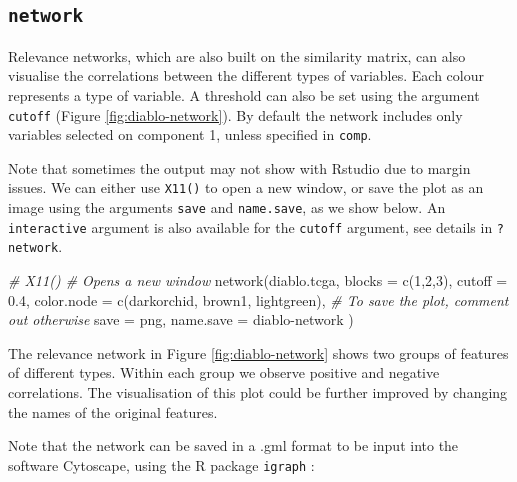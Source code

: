 \documentclass[
]{book}
\newenvironment{Shaded}{\begin{snugshade}}{\end{snugshade}}
\newcommand{\AttributeTok}[1]{\textcolor[rgb]{0.77,0.63,0.00}{#1}}
\newcommand{\CommentTok}[1]{\textcolor[rgb]{0.56,0.35,0.01}{\textit{#1}}}
\newcommand{\DecValTok}[1]{\textcolor[rgb]{0.00,0.00,0.81}{#1}}
\newcommand{\FloatTok}[1]{\textcolor[rgb]{0.00,0.00,0.81}{#1}}
\newcommand{\FunctionTok}[1]{\textcolor[rgb]{0.00,0.00,0.00}{#1}}
\newcommand{\NormalTok}[1]{#1}
\newcommand{\StringTok}[1]{\textcolor[rgb]{0.31,0.60,0.02}{#1}}
\begin{document}
\hypertarget{network}{%
\subsection{\texorpdfstring{\texttt{network}}{network}}\label{network}}

Relevance networks, which are also built on the similarity matrix, can also visualise the correlations between the different types of variables. Each colour represents a type of variable. A threshold can also be set using the argument \texttt{cutoff} (Figure \ref{fig:diablo-network}). By default the network includes only variables selected on component 1, unless specified in \texttt{comp}.

Note that sometimes the output may not show with Rstudio due to margin issues. We can either use \texttt{X11()} to open a new window, or save the plot as an image using the arguments \texttt{save} and \texttt{name.save}, as we show below. An \texttt{interactive} argument is also available for the \texttt{cutoff} argument, see details in \texttt{?network}.

\begin{Shaded}
\begin{Highlighting}[]
\CommentTok{\# X11()   \# Opens a new window}
\FunctionTok{network}\NormalTok{(diablo.tcga, }\AttributeTok{blocks =} \FunctionTok{c}\NormalTok{(}\DecValTok{1}\NormalTok{,}\DecValTok{2}\NormalTok{,}\DecValTok{3}\NormalTok{), }
        \AttributeTok{cutoff =} \FloatTok{0.4}\NormalTok{,}
        \AttributeTok{color.node =} \FunctionTok{c}\NormalTok{(}\StringTok{\textquotesingle{}darkorchid\textquotesingle{}}\NormalTok{, }\StringTok{\textquotesingle{}brown1\textquotesingle{}}\NormalTok{, }\StringTok{\textquotesingle{}lightgreen\textquotesingle{}}\NormalTok{),}
        \CommentTok{\# To save the plot, comment out otherwise}
        \AttributeTok{save =} \StringTok{\textquotesingle{}png\textquotesingle{}}\NormalTok{, }\AttributeTok{name.save =} \StringTok{\textquotesingle{}diablo{-}network\textquotesingle{}}
\NormalTok{        )}
\end{Highlighting}
\end{Shaded}



The relevance network in Figure \ref{fig:diablo-network} shows two groups of features of different types. Within each group we observe positive and negative correlations. The visualisation of this plot could be further improved by changing the names of the original features.

Note that the network can be saved in a .gml format to be input into the software Cytoscape, using the R package \texttt{igraph} \citep{csa06}:
\end{document}
